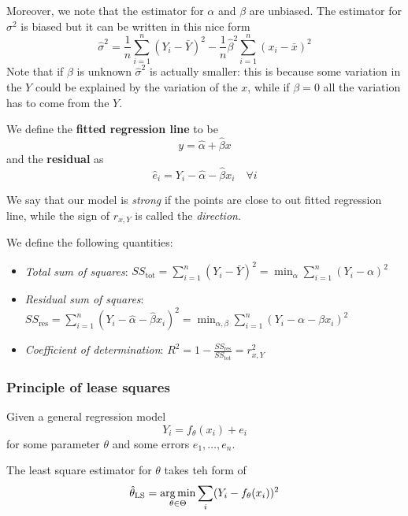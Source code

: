 \documentclass[12pt]{extarticle}
\begin{document}
Moreover, we note that the estimator for $\alpha$ and $\beta$ are unbiased.
The estimator for $\sigma^2$ is biased but it can be written in this nice form
\begin{equation}
	\hat \sigma^2 = \frac{1}{n}\sum_{i = 1}^n (Y_i - \bar Y)^2 - \frac{1}{n} \hat \beta^2 \sum_{i = 1}^n (x_i - \bar x)^2
\end{equation}
Note that if $\beta$ is unknown $\hat \sigma^2$ is actually smaller:
this is because some variation in the $Y$ could be explained by the variation of the $x$,
while if $\beta = 0$ all the variation has to come from the $Y$.

We define the \textbf{fitted regression line} to be
\begin{equation}
	y = \hat \alpha + \hat \beta x
\end{equation}
and the \textbf{residual} as
\begin{equation}
	\hat e_i = Y_i - \hat \alpha - \hat \beta x_i \quad \forall i
\end{equation}

We say that our model is \emph{strong} if the points are close to out fitted regression line,
while the sign of $r_{x, Y}$ is called the \emph{direction}.

We define the following quantities:
\begin{itemize}
	\item \emph{Total sum of squares}: $SS_\text{tot} = \sum_{i = 1}^n (Y_i - \bar Y)^2 = \min_\alpha \sum_{i = 1}^n (Y_i - \alpha)^2$
	\item \emph{Residual sum of squares}: $SS_\text{res} = \sum_{i = 1}^n (Y_i - \hat \alpha - \hat \beta x_i)^2 = \min_{\alpha, \beta} \sum_{i = 1}^n (Y_i - \alpha - \beta x_i)^2$
	\item \emph{Coefficient of determination}: $R^2 = 1 - \frac{SS_\text{res}}{SS_\text{tot}} = r^2_{x, Y}$
\end{itemize}

\subsubsection{Principle of lease squares}
Given a general regression model
\begin{equation}
	Y_i = f_\theta(x_i) + e_i
\end{equation}
for some parameter $\theta$ and some errors $e_1, \dots, e_n$.

The least square estimator for $\theta$ takes teh form of
\begin{equation}
	\hat \theta_\text{LS} = \operatorname*{arg\,min}_{\theta \in \Theta} \sum_{i}(Y_i - f_\theta(x_i))^2
\end{equation}
\end{document}
